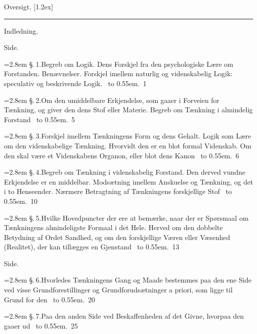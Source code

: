 \documentclass[12pt]{book}
\def\sperr#1{#1}%
\def\textit#1{#1}%
\def\\{ }%
\newcommand{\sperr}[1]{\textls[180]{#1}}
\newcommand{\ovhead}[1]{%
  \begin{center}{\Large\sperr{#1}}\\[1.2ex]\rule{0.30\linewidth}{0.4pt}\end{center}
  \vspace{0.6\baselineskip}
}
\newcommand{\ovside}{\par\nopagebreak\hfill{\footnotesize Side.}\par\nobreak\vspace{0.2\baselineskip}}
\newcommand{\ovgroup}[1]{%
  \par\vspace{0.7\baselineskip}\begin{center}{#1\par}\end{center}
  \vspace{0.3\baselineskip}}
\newcommand{\ovline}[3]{%
  \par\vspace{0.25\baselineskip}%
  \noindent\hangindent=2.8em\hangafter=1
  \textit{\S.\,#1.}\quad #2%
  \nobreak\ \leaders\hbox to 0.55em{\hss.\hss}\hfill\ \textit{#3}\par}
\begin{document}
%
%
%

\ovhead{Oversigt.}

\ovgroup{Indledning.}
\ovside
\ovline{1}{Begreb om Logik. Dens Forskjel fra den psychologiske Lære om
  Forstanden. Benævnelser. Forskjel imellem naturlig og videnskabelig Logik:
  speculativ og beskrivende Logik.}{1}
\ovline{2}{Om den umiddelbare Erkjendelse, som gaaer i Forveien for Tænkning,
  og giver den dens Stof eller Materie. Begreb om Tænkning i almindelig
  Forstand}{5}
\ovline{3}{Forskjel imellem Tænkningens Form og dens Gehalt. Logik som Lære om
  den videnskabelige Tænkning. Hvorvidt den er en blot formal Videnskab. Om den
  skal være et Videnskabens Organon, eller blot dens Kanon}{6}
\ovline{4}{Begreb om Tænkning i videnskabelig Forstand. Den derved vundne
  Erkjendelse er en middelbar. Modsætning imellem Anskuelse og Tænkning, og det
  i to Henseender. Nærmere Betragtning af Tænkningens forskjellige Stof}{10}
\ovline{5}{Hvilke Hovedpuncter der ere at bemærke, naar der er Spørsmaal om
  Tænkningens almindeligste Formaal i det Hele. Herved om den dobbelte Betydning
  af Ordet Sandhed, og om den forskjellige Væren eller Væsenhed (Realitet), der
  kan tillægges en Gjenstand}{13}

\ovside
\ovline{6}{Hvorledes Tænkningens Gang og Maade bestemmes paa den ene Side ved
  visse Grundforestillinger og Grundforudsætninger \textit{a priori}, som ligge
  til Grund for den}{20}
\ovline{7}{Paa den anden Side ved Beskaffenheden af det Givne, hvorpaa den
  gaaer ud}{25}
\end{document}
